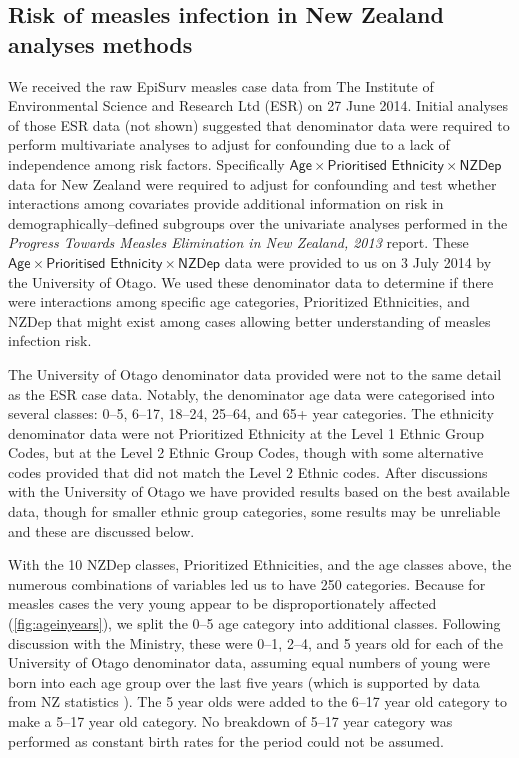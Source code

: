 \documentclass{article}
\begin{document}
\subsection{Risk of measles infection in New Zealand analyses methods}
\label{sub:regression}
We received the raw EpiSurv measles case data from The Institute of Environmental Science and Research Ltd (ESR) on 27 June 2014. Initial analyses of those ESR data (not shown) suggested that denominator data were required to perform multivariate analyses to adjust for confounding due to a lack of independence among risk factors. Specifically $\textsf{Age} \times \textsf{Prioritised Ethnicity} \times \textsf{NZDep}$ data for New Zealand were required to adjust for confounding and test whether interactions among covariates provide additional information on risk in demographically--defined subgroups over the univariate analyses performed in the \emph{Progress Towards Measles Elimination in New Zealand, 2013} report. These $\textsf{Age} \times \textsf{Prioritised Ethnicity} \times \textsf{NZDep}$ data were provided to us on 3 July 2014 by the University of Otago. We used these denominator data to determine if there were interactions among specific age categories, Prioritized Ethnicities, and NZDep that might exist among cases allowing better understanding of measles infection risk.

The University of Otago denominator data provided were not to the same detail as the ESR case data. Notably, the denominator age data were categorised into several classes: 0--5, 6--17, 18--24, 25--64, and 65+ year categories. The ethnicity denominator data were not Prioritized Ethnicity at the Level 1 Ethnic Group Codes, but at the Level 2 Ethnic Group Codes, though with some alternative codes provided that did not match the Level 2 Ethnic codes. After discussions with the University of Otago we have provided results based on the best available data, though for smaller ethnic group categories, some results may be unreliable and these are discussed below.

With the 10 NZDep classes, Prioritized Ethnicities, and the age classes above, the numerous combinations of variables led us to have 250 categories. Because for measles cases the very young appear to be disproportionately affected (\autoref{fig:ageinyears}), we split the 0--5 age category into additional classes. Following discussion with the Ministry, these were 0--1, 2--4, and 5 years old for each of the University of Otago denominator data, assuming equal numbers of young were born into each age group over the last five years (which is supported by data from NZ statistics \citep{stats14}). The 5 year olds were added to the 6--17 year old category to make a 5--17 year old category. No breakdown of 5--17 year category was performed as constant birth rates for the period could not be assumed.
\end{document}
